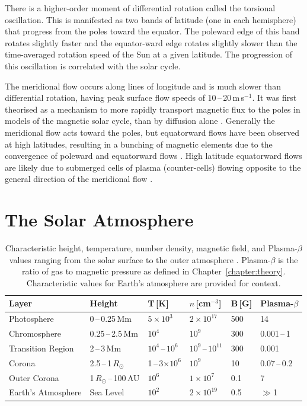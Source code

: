 There is a higher-order moment of differential rotation called the torsional oscillation. This is manifested as two bands of latitude (one in each hemisphere) that progress from the poles toward the equator. The poleward edge of this band rotates slightly faster and the equator-ward edge rotates slightly slower than the time-averaged rotation speed of the Sun at a given latitude. The progression of this oscillation is correlated with the solar cycle. 

The meridional flow occurs along lines of longitude and is much slower than differential rotation, having peak surface flow speeds of 10\,--\,20\,m\,s$^{-1}$. It was first theorised as a mechanism to more rapidly transport magnetic flux to the poles in models of the magnetic solar cycle, than by diffusion alone \citep{Mosher:1977,Sheeley:2005}. Generally the meridional flow acts toward the poles, but equatorward flows have been observed at high latitudes, resulting in a bunching of magnetic elements due to the convergence of poleward and equatorward flows \citep{Ulrich:2005}. High latitude equatorward flows are likely due to submerged cells of plasma (counter-cells) flowing opposite to the general direction of the meridional flow \citep{Haber:2002}. 

\section{The Solar Atmosphere}\label{intro:atmosphere}

\begin{table}%
\caption[Characteristic property values for the solar surface and atmosphere.]{Characteristic height, temperature, number density, magnetic field, and Plasma-$\beta$ values ranging from the solar surface to the outer atmosphere \citep{Aschwanden:2005, Goossens:2003, Gary:2001}. Plasma-$\beta$ is the ratio of gas to magnetic pressure as defined in Chapter~\ref{chapter:theory}. Characteristic values for Earth's atmosphere are provided for context.}
\label{table:atmoscharprop}
\begin{tabular}{llllll}     %
  \hline                   %
  \hline
Layer & Height & T\,[K] & $n$\,[cm$^{-3}$] & B\,[G] & Plasma-$\beta$ \\
  \hline
Photosphere & 0\,--\,0.25\,Mm & $5\times10^3$  & $2\times10^{17}$ & 500 & 14 \\
Chromosphere & 0.25\,--\,2.5\,Mm & $10^4$  & $10^9$ & 300 & 0.001\,--\,1 \\
Transition Region & 2\,--\,3\,Mm & $10^4$\,--\,$10^6$ & $10^9$\,--\,$10^{11}$ & 300 & 0.001 \\
Corona & 2.5\,--\,1\,$R_{\odot}$ & 1\,--\,3$\times10^6$  & $10^9$ & 10 & 0.07\,--\,0.2 \\
Outer Corona & 1\,$R_{\odot}$\,--\,100\,AU & $10^6$ & $1\times10^7$ & 0.1 & 7 \\
Earth's Atmosphere & Sea Level & $10^2$ & $2\times10^{19}$ & 0.5 & $\gg$1 \\
\hline
\end{tabular}
\end{table}

